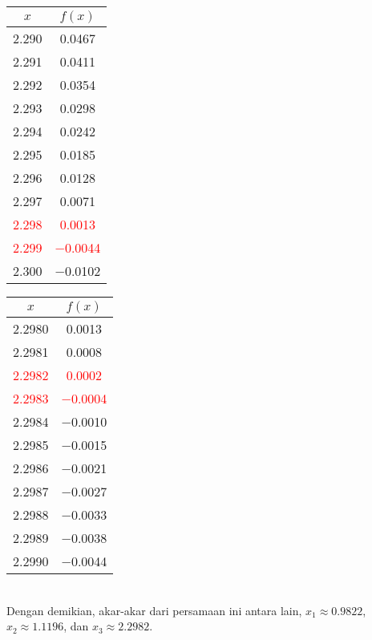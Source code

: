\documentclass{article}
\begin{document}
\begin{enumerate}
\begin{enumerate}
\begin{tabular}{|c|c|}
            \hline
            $x$   & $f(x)$ \\
            \hline
            \num{2,290} & \num{0,0467} \\
            \num{2,291} & \num{0,0411} \\
            \num{2,292} & \num{0,0354} \\
            \num{2,293} & \num{0,0298} \\
            \num{2,294} & \num{0,0242} \\
            \num{2,295} & \num{0,0185} \\
            \num{2,296} & \num{0,0128} \\
            \num{2,297} & \num{0,0071} \\
            \textcolor{red}{\num{2,298}} & \textcolor{red}{\num{0,0013}} \\
            \textcolor{red}{\num{2,299}} & \textcolor{red}{\num{-0,0044}} \\
            \num{2,300} & \num{-0,0102} \\
            \hline
            \end{tabular}\quad
            \begin{tabular}{|c|c|}
            \hline
            $x$   & $f(x)$ \\
            \hline
            \num{2,2980} & \num{0,0013} \\
            \num{2,2981} & \num{0,0008} \\
            \textcolor{red}{\num{2,2982}} & \textcolor{red}{\num{0,0002}} \\
            \textcolor{red}{\num{2,2983}} & \textcolor{red}{\num{-0,0004}} \\
            \num{2,2984} & \num{-0,0010} \\
            \num{2,2985} & \num{-0,0015} \\
            \num{2,2986} & \num{-0,0021} \\
            \num{2,2987} & \num{-0,0027} \\
            \num{2,2988} & \num{-0,0033} \\
            \num{2,2989} & \num{-0,0038} \\
            \num{2,2990} & \num{-0,0044} \\
            \hline
            \end{tabular}\quad \\
            Dengan demikian, akar-akar dari persamaan ini antara lain, $x_1 \approx \num{0,9822}$, $x_2 \approx \num{1,1196}$, dan $x_3 \approx \num{2,2982}$.
    \end{enumerate}


\end{enumerate}
\end{document}
